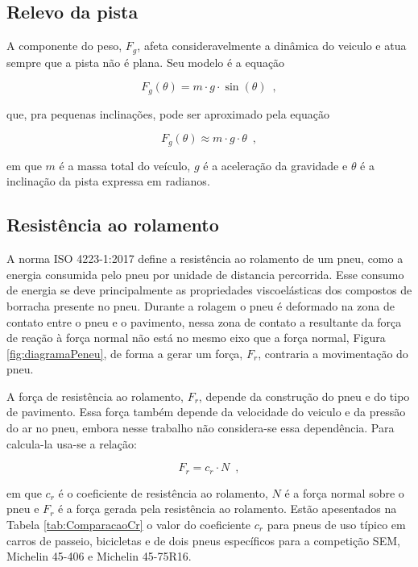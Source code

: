 \subsection{Relevo da pista}

A componente do peso, $F_{g}$, afeta consideravelmente a dinâmica do veiculo e atua sempre que a pista não é plana. Seu modelo é a equação

\[
	F_{g}(\theta) = m \cdot g \cdot \sin(\theta)
	\enspace,
\]

que, pra pequenas inclinações, pode ser aproximado pela equação

\begin{equation}
	\label{eq:Fg}
	F_{g}(\theta) \approx  m \cdot g \cdot \theta
	\enspace,
\end{equation}

em que $m$ é a massa total do veículo, $g$ é a aceleração da gravidade e $\theta$ é a inclinação da pista expressa em
radianos\cite{book:guzzella2012vehicle}.

\subsection{Resistência ao rolamento}
\label{subsec:resistencia_rolamento}

A norma ISO 4223-1:2017 define a resistência ao rolamento de um pneu, como a energia consumida pelo pneu por unidade de distancia
percorrida. Esse consumo de energia se deve principalmente as propriedades viscoelásticas dos compostos de borracha presente no pneu.
Durante a rolagem o pneu é deformado na zona de contato entre o pneu e o pavimento, nessa zona de contato a resultante da força de reação à força
normal não
está no mesmo eixo que a força normal, Figura \ref{fig:diagramaPeneu}, de forma a gerar um força, $F_{r}$, contraria a movimentação do pneu.



A força de resistência ao rolamento, $F_{r}$, depende da construção do pneu e do tipo de pavimento. Essa força também depende da velocidade do
veiculo e da pressão do ar no pneu,
embora nesse trabalho não considera-se essa dependência. Para calcula-la usa-se a relação:

\begin{equation}
	\label{eq:Fr}
	F_{r}  = c_{r} \cdot N
	\enspace,
\end{equation}

em que $c_{r}$ é o coeficiente de resistência ao rolamento, $N$ é a força normal sobre o pneu e $F_{r}$ é a força
gerada pela resistência ao rolamento.
Estão apesentados na Tabela \ref{tab:ComparacaoCr}
o valor do coeficiente $c_{r}$ para pneus de uso típico em carros de passeio, bicicletas e de dois pneus específicos para a competição SEM, Michelin
45-406 e Michelin 45-75R16.

